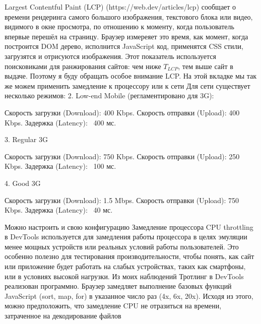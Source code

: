 \documentclass[12pt]{article}
\begin{document}
    Largest Contentful Paint (LCP) (https://web.dev/articles/lcp) сообщает о времени рендеринга самого большого изображения, текстового блока или видео,
    видимого в окне просмотра, по отношению к моменту, когда пользователь впервые перешёл на страницу. Браузер измереяет это время, как момент, когда построится DOM дерево, исполнится JavaScript код, применятся CSS стили, загрузятся и отрисуются изображения. Этот показатель используется поисковиками для ранжирования сайтов: чем ниже $T_{LCP}$, тем выше сайт в выдаче.
    Поэтому я буду обращать особое внимание LCP.
    На этой вкладке мы так же можем применить замедление к процессору или к сети
    Для сети существует несколько режимов:
    2. Low-end Mobile (регламентировано для 3G):

    Скорость загрузки (Download): 400 Kbps.
    Скорость отправки (Upload): 400 Kbps.
    Задержка (Latency): ~400 мс.

    3. Regular 3G

    Скорость загрузки (Download): 750 Kbps.
    Скорость отправки (Upload): 250 Kbps.
    Задержка (Latency): ~100 мс.

    4. Good 3G

    Скорость загрузки (Download): 1.5 Mbps.
    Скорость отправки (Upload): 750 Kbps.
    Задержка (Latency): ~40 мс.

    Можно настроить и свою конфигурацию
    Замедление процессора
    CPU throttling в DevTools используется для замедления работы процессора в целях эмуляции менее мощных устройств или реальных условий работы пользователей.
    Это особенно полезно для тестирования производительности, чтобы понять, как сайт или приложение будет работать на слабых устройствах,
    таких как смартфоны, или в условиях высокой нагрузки.
    Из моих наблюдений
    Тротлинг в DevTools реализован программно. Браузер замедляет выполнение базовых функций JavaScript (sort, map, for) в указанное число раз (4x, 6x, 20x).
    Исходя из этого, можно предположить, что замедление CPU не отразиться на времени, затраченное на декодирование файлов
\end{document}
